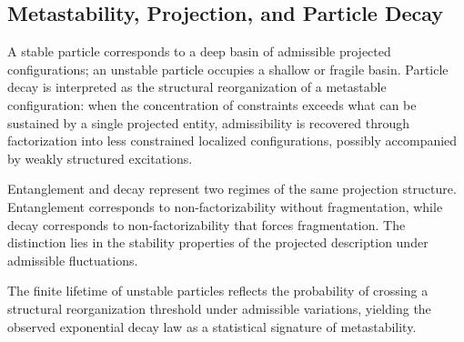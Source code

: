 \subsection{Metastability, Projection, and Particle Decay}
\label{subsec:metastability-and-decay}

A stable particle corresponds to a deep basin of admissible projected
configurations; an unstable particle occupies a shallow or fragile basin.
Particle decay is interpreted as the structural reorganization of a
metastable configuration: when the concentration of constraints exceeds
what can be sustained by a single projected entity, admissibility is
recovered through factorization into less constrained localized
configurations, possibly accompanied by weakly structured excitations.

Entanglement and decay represent two regimes of the same projection
structure.
Entanglement corresponds to non-factorizability without fragmentation,
while decay corresponds to non-factorizability that forces fragmentation.
The distinction lies in the stability properties of the projected
description under admissible fluctuations.

The finite lifetime of unstable particles reflects the probability of
crossing a structural reorganization threshold under admissible
variations, yielding the observed exponential decay law as a statistical
signature of metastability.

